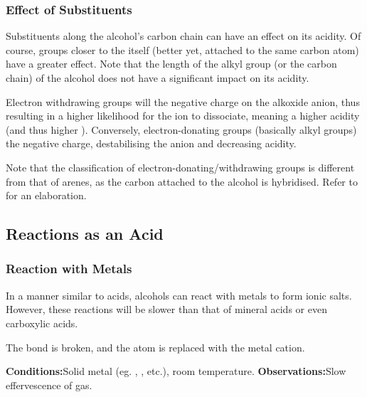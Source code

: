 			\subsubsection{Effect of Substituents}

				Substituents along the alcohol's carbon chain can have an effect on its acidity. Of course, groups closer to the 
				itself (better yet, attached to the same carbon atom) have a greater effect. Note that the length of the alkyl group
				(or the carbon chain) of the alcohol does not have a significant impact on its acidity.

				Electron withdrawing groups will  the negative charge on the alkoxide anion, thus resulting in a higher
				likelihood for the  ion to dissociate, meaning a higher acidity (and thus higher \Ka). Conversely, electron-donating
				groups (basically alkyl groups)  the negative charge, destabilising the anion and decreasing acidity.

				Note that the classification of electron-donating/withdrawing groups is different from that of arenes, as the carbon
				attached to the alcohol is \spthree hybridised. Refer to \hyperlink{CaveatResonanceTable}{} for an
				elaboration.



		\pagebreak
		\subsection{Reactions as an Acid}

			\subsubsection{Reaction with Metals}
				In a manner similar to acids, alcohols can react with  metals to form ionic salts. However, these reactions
				will be slower than that of mineral acids or even carboxylic acids.

				The  bond is broken, and the  atom is replaced with the metal cation.


				\vspace{1.5em}
				\vbox{\textbf{Conditions:}\tabto{35mm}Solid metal (eg. , , etc.), room temperature.}
				\vbox{\textbf{Observations:}\tabto{35mm}Slow effervescence of  gas.}


